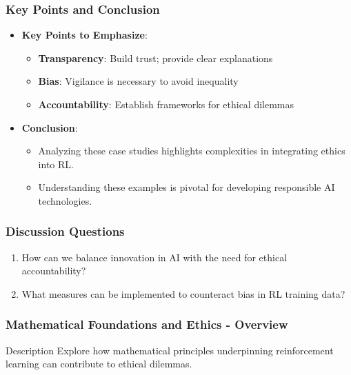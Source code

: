 \documentclass[aspectratio=169]{beamer}
\begin{document}
\begin{frame}[fragile]
    \frametitle{Key Points and Conclusion}
    \begin{itemize}
        \item \textbf{Key Points to Emphasize}:
        \begin{itemize}
            \item \textbf{Transparency}: Build trust; provide clear explanations
            \item \textbf{Bias}: Vigilance is necessary to avoid inequality
            \item \textbf{Accountability}: Establish frameworks for ethical dilemmas
        \end{itemize}
        \item \textbf{Conclusion}:
        \begin{itemize}
            \item Analyzing these case studies highlights complexities in integrating ethics into RL.
            \item Understanding these examples is pivotal for developing responsible AI technologies.
        \end{itemize}
    \end{itemize}
\end{frame}

\begin{frame}[fragile]
    \frametitle{Discussion Questions}
    \begin{enumerate}
        \item How can we balance innovation in AI with the need for ethical accountability?
        \item What measures can be implemented to counteract bias in RL training data?
    \end{enumerate}
\end{frame}

\begin{frame}[fragile]
    \frametitle{Mathematical Foundations and Ethics - Overview}
    \begin{block}{Description}
        Explore how mathematical principles underpinning reinforcement learning can contribute to ethical dilemmas.
    \end{block}
\end{frame}
\end{document}

